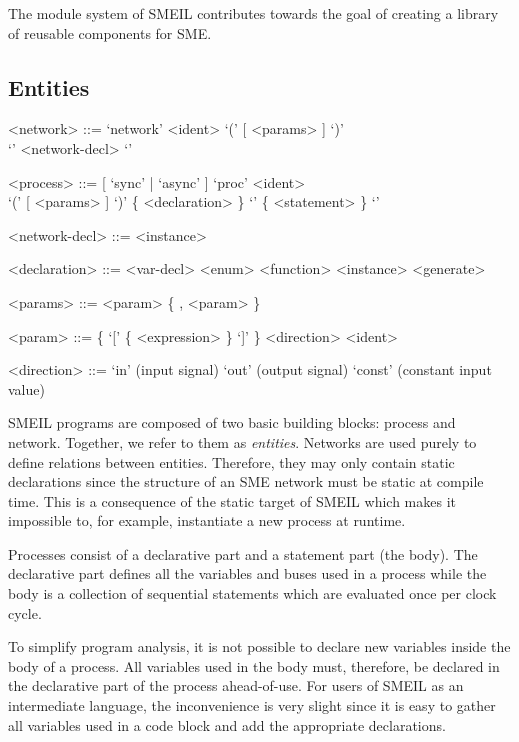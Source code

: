 The module system of SMEIL contributes towards the goal of creating a library of
reusable components for SME.



\subsection{Entities}
\begin{grammar}
  <network> ::= `network' <ident> `(' [ <params> ] `)' \\`{' <network-decl> `}'

  <process> ::= [ `sync' | `async' ] `proc' <ident> \\ `(' [
             <params> ] `)' \{ <declaration> \} `{' \{ <statement> \} `}'

  <network-decl> ::= <instance>

  <declaration> ::= <var-decl>
  \alt <enum>
  \alt <function>
  \alt <instance>
  \alt <generate>
  
  <params> ::= <param> \{ , <param> \}

  <param> ::= \{ `[' \{ <expression> \} `]' \} <direction> <ident>

  <direction> ::= `in' (input signal)
  \alt `out' (output signal)
  \alt `const' (constant input value)  
\end{grammar}

SMEIL programs are composed of two basic building blocks: {\ttfamily process}
and {\ttfamily network}. Together, we refer to them as {\itshape
  entities}. Networks are used purely to define relations between
entities. Therefore, they may only contain static declarations since the
structure of an SME network must be static at compile time. This is a
consequence of the static target of SMEIL which makes it impossible to, for
example, instantiate a new process at runtime.

Processes consist of a declarative part and a statement part (the
body). The declarative part defines all the variables and buses used in a
process while the body is a collection of sequential statements which are
evaluated once per clock cycle.

To simplify program analysis, it is not possible to declare new variables inside
the body of a process. All variables used in the body must, therefore, be
declared in the declarative part of the process ahead-of-use.
For users of SMEIL as an intermediate language, the inconvenience is very slight
since it is easy to gather all variables used in a code block and add the
appropriate declarations.


